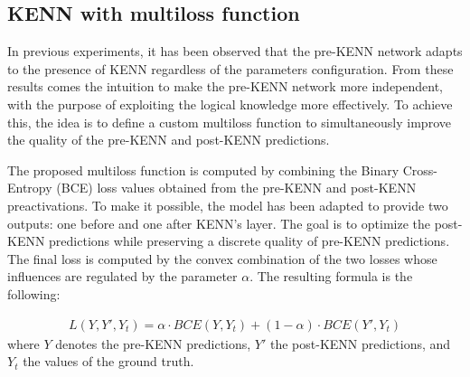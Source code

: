\subsection{KENN with multiloss function}
In previous experiments, it has been observed that the pre-KENN network adapts to the presence of KENN regardless of the parameters configuration. From these results comes the intuition to make the pre-KENN network more independent, with the purpose of exploiting the logical knowledge more effectively. To achieve this, the idea is to define a custom multiloss function to simultaneously improve the quality of the pre-KENN and post-KENN predictions.

The proposed multiloss function is computed by combining the Binary Cross-Entropy (BCE) loss values obtained from the pre-KENN and post-KENN preactivations. To make it possible, the model has been adapted to provide two outputs: one before and one after KENN's layer. The goal is to optimize the post-KENN predictions while preserving a discrete quality of pre-KENN predictions. The final loss is computed by the convex combination of the two losses whose influences are regulated by the parameter $ \alpha $. The resulting formula is the following:


\begin{gather*}
    L(Y, Y', Y_{t}) = \alpha \cdot BCE(Y, Y_{t}) + (1 - \alpha) \cdot BCE(Y', Y_{t})
\end{gather*}
where $Y$ denotes the pre-KENN predictions, $Y'$ the post-KENN predictions, and $Y_{t}$ the values of the ground truth.


